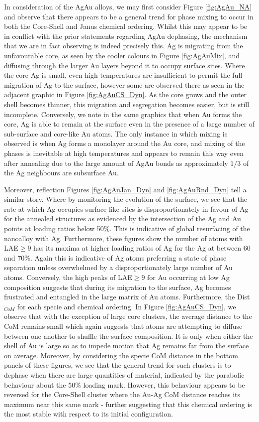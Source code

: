 In consideration of the AgAu alloys, we may first consider Figure \ref{fig:AgAu_NA} and observe that there appears to be a general trend for phase mixing to occur in both the Core-Shell and Janus chemical ordering. Whilst this may appear to be in conflict with the prior statements regarding AgAu dephasing, the mechanism that we are in fact observing is indeed precisely this. Ag is migrating from the unfavourable core, as seen by the cooler colours in Figure \ref{fig:AgAuMix}, and diffusing through the larger Au layers beyond it to occupy surface sites. Where the core Ag is small, even high temperatures are insufficient to permit the full migration of Ag to the surface, however some are observed there as seen in the adjacent graphic in Figure \ref{fig:AgAuCS_Dyn}. As the core grows and the outer shell becomes thinner, this migration and segregation becomes easier, but is still incomplete. Conversely, we note in the same graphics that when Au forms the core, Ag is able to remain at the surface even in the presence of a large number of sub-surface and core-like Au atoms. The only instance in which mixing is observed is when Ag forms a monolayer around the Au core, and mixing of the phases is inevitable at high temperatures and appears to remain this way even after annealing due to the large amount of AgAu bonds as approximately $1/3$ of the Ag neighbours are subsurface Au.

Moreover, reflection Figures \ref{fig:AgAuJan_Dyn} and \ref{fig:AgAuRnd_Dyn} tell a similar story. Where by monitoring the evolution of the surface, we see that the rate at which Ag occupies surface-like sites is disproportionately in favour of Ag for the annealed structures as evidenced by the intersection of the Ag and Au points at loading ratios below 50\%. This is indicative of global resurfacing of the nanoalloy with Ag. Furthermore, these figures show the number of atoms with LAE$\geq9$ has its maxima at higher loading ratios of Ag for the Ag at between 60 and 70\%. Again this is indicative of Ag atoms preferring a state of phase separation unless overwhelmed by a disproportionately large number of Au atoms. Conversely, the high peaks of LAE$\geq9$ for Au  occurring at low Ag composition suggests that during its migration to the surface, Ag becomes frustrated and entangled in the large matrix of Au atoms. Furthermore, the Dist$_{CoM}$ for each specie and chemical ordering. In Figure \ref{fig:AgAuCS_Dyn}, we observe that with the exception of large core clusters, the average distance to the CoM remains small which again suggests that atoms are attempting to diffuse between one another to shuffle the surface composition. It is only when either the shell of Au is large so as to impede motion that Ag remains far from the surface on average. Moreover, by considering the specie CoM distance in the bottom panels of these figures, we see that the general trend for such clusters is to dephase when there are large quantities of material, indicated by the parabolic behaviour about the 50\% loading mark. However, this behaviour appears to be reversed for the Core-Shell cluster where the Au-Ag CoM distance reaches its maximum near this same mark - further suggesting that this chemical ordering is the most stable with respect to its initial configuration.  

